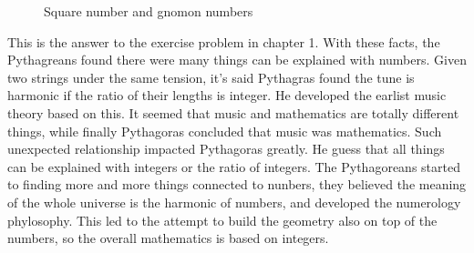 \documentclass{article}
\begin{document}
\begin{figure}[htbp]
\centering
{}
\caption{Square number and gnomon numbers}
\label{fig:square-num}
\end{figure}

This is the answer to the exercise problem in chapter 1. With these facts, the Pythagreans found there were many things can be explained with numbers. Given two strings under the same tension, it's said Pythagras found the tune is harmonic if the ratio of their lengths is integer. He developed the earlist music theory based on this. It seemed that music and mathematics are totally different things, while finally Pythagoras concluded that music was mathematics. Such unexpected relationship impacted Pythagoras greatly. He guess that all things can be explained with integers or the ratio of integers. The Pythagoreans started to finding more and more things connected to nunbers, they believed the meaning of the whole universe is the harmonic of numbers, and developed the numerology phylosophy. This led to the attempt to build the geometry also on top of the numbers, so the overall mathematics is based on integers.
\end{document}

